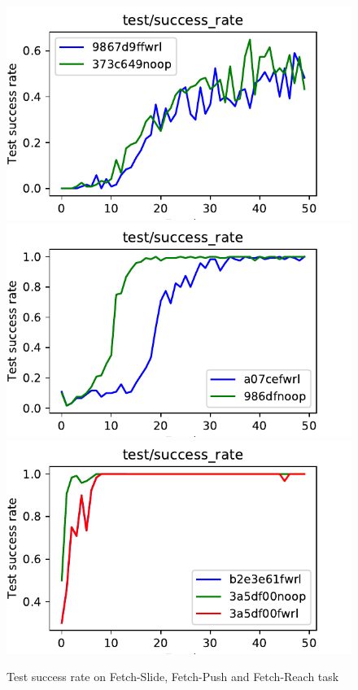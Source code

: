 \begin{figure}
  \def\frac{0.32}
    \includegraphics[width=\frac\columnwidth]{media/res/373c649_FetchSlide-v1-noop/test/success_rate.pdf}%
    \includegraphics[width=\frac\columnwidth]{media/res/a077c9e_FetchPush-v1-fwrl/test/success_rate.pdf}%
    \includegraphics[width=\frac\columnwidth]{media/res/3a5df00_FetchReach-v1-fwrl/test/success_rate.pdf}
    \caption{Test success rate on Fetch-Slide, Fetch-Push and Fetch-Reach task}
    \label{fig:fetch-slide-success}
\end{figure}

